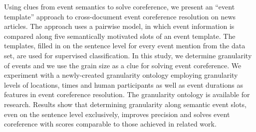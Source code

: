 Using clues from event semantics to solve coreference, we present an ``event template'' approach to cross-document event coreference resolution on news articles. The approach uses a pairwise model, in which event information is compared along five semantically motivated slots of an event template. The templates, filled in on the sentence level for every event mention from the data set, are used for supervised classification. In this study, we determine granularity of events and we use the grain size as a clue for solving event coreference. We experiment with a newly-created granularity ontology employing granularity levels of locations, times and human participants as well as event durations as features in event coreference resolution. The granularity ontology is available for research. Results show that determining granularity along semantic event slots, even on the sentence level exclusively, improves precision and solves event coreference with scores comparable to those achieved in related work.
